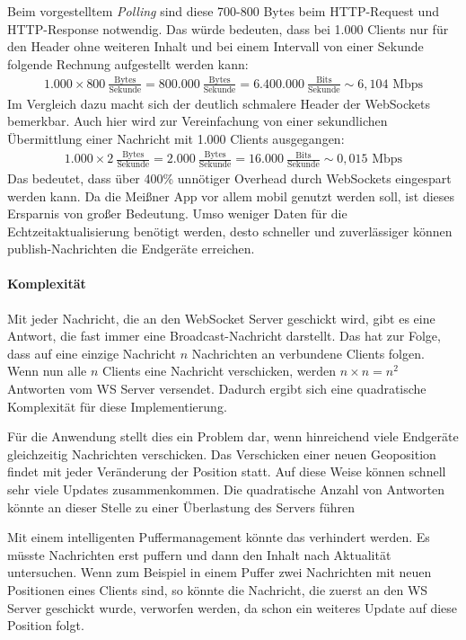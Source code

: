 Beim vorgestelltem \emph{Polling} sind diese 700-800 Bytes beim HTTP-Request und HTTP-Response notwendig. Das würde bedeuten, dass bei 1.000 Clients nur für den Header ohne weiteren Inhalt und bei einem Intervall von einer Sekunde folgende Rechnung aufgestellt werden kann:
\begin{align*}
	1.000 \times 800 \ \frac{\mbox{Bytes}}{\mbox{Sekunde}}= 800.000 \ \frac{\mbox{Bytes}}{\mbox{Sekunde}} = 6.400.000 \ \frac{\mbox{Bits}}{\mbox{Sekunde}} \sim 6,104 \mbox{ Mbps}
\end{align*}
Im Vergleich dazu macht sich der deutlich schmalere Header der WebSockets bemerkbar. Auch hier wird zur Vereinfachung von einer sekundlichen Übermittlung einer Nachricht mit 1.000 Clients ausgegangen:
\begin{align*}
	1.000 \times 2 \ \frac{\mbox{Bytes}}{\mbox{Sekunde}}= 2.000 \ \frac{\mbox{Bytes}}{\mbox{Sekunde}} = 16.000 \ \frac{\mbox{Bits}}{\mbox{Sekunde}} \sim 0,015 \mbox{ Mbps}
\end{align*}
Das bedeutet, dass über 400\% unnötiger Overhead durch WebSockets eingespart werden kann. Da die Meißner App vor allem mobil genutzt werden soll, ist dieses Ersparnis von großer Bedeutung. Umso weniger Daten für die Echtzeitaktualisierung benötigt werden, desto schneller und zuverlässiger können publish-Nachrichten die Endgeräte erreichen.

\paragraph{Komplexität}
Mit jeder Nachricht, die an den WebSocket Server geschickt wird, gibt es eine Antwort, die fast immer eine Broadcast-Nachricht darstellt. Das hat zur Folge, dass auf eine einzige Nachricht $n$ Nachrichten an verbundene Clients folgen. Wenn nun alle $n$ Clients eine Nachricht verschicken, werden $n \times n = n^2$ Antworten vom WS Server versendet. Dadurch ergibt sich eine quadratische Komplexität für diese Implementierung.\par

Für die Anwendung stellt dies ein Problem dar, wenn hinreichend viele Endgeräte gleichzeitig Nachrichten verschicken. Das Verschicken einer neuen Geoposition findet mit jeder Veränderung der Position statt. Auf diese Weise können schnell sehr viele Updates zusammenkommen. Die quadratische Anzahl von Antworten könnte an dieser Stelle zu einer Überlastung des Servers führen\par

Mit einem intelligenten Puffermanagement könnte das verhindert werden. Es müsste Nachrichten erst puffern und dann den Inhalt nach Aktualität untersuchen. Wenn zum Beispiel in einem Puffer zwei Nachrichten mit neuen Positionen eines Clients sind, so könnte die Nachricht, die zuerst an den WS Server geschickt wurde, verworfen werden, da schon ein weiteres Update auf diese Position folgt.\\

